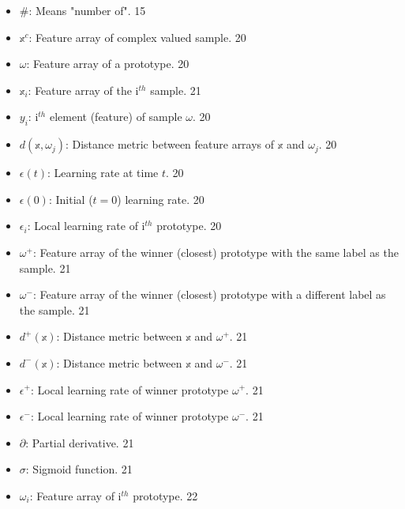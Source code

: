 \documentclass[12pt,twoside]{report}
\begin{document}
\begin{spacing}{1.5}
\begin{itemize}
  \item \#: Means "number of". 15

  \item $\mathbb{x}^{c}$: Feature array of complex valued sample. 20

  \item $\omega$: Feature array of a prototype. 20

  \item $\mathbb{x}_i$: Feature array of the i$^{th}$ sample. 21

\item $y_{i}$: i$^{th}$ element (feature) of sample $\omega$. 20

\item $d(\mathbb{x},\omega_{j})$: Distance metric between feature arrays of $\mathbb{x}$ and $\omega_{j}$. 20

\item $\epsilon(t)$: Learning rate at time $t$. 20

\item $\epsilon(0)$: Initial ($t=0$) learning rate. 20

\item $\epsilon_{i}$: Local learning rate of i$^{th}$ prototype. 20

\item $\omega^{+}$: Feature array of the winner (closest) prototype with the same label as the sample. 21

\item $\omega^{-}$: Feature array of the winner (closest) prototype with a different label as the sample. 21

\item $d^{+}(\mathbb{x})$: Distance metric between $\mathbb{x}$ and $\omega^{+}$. 21

\item $d^{-}(\mathbb{x})$: Distance metric between $\mathbb{x}$ and $\omega^{-}$. 21

\item $\epsilon^{+}$: Local learning rate of winner prototype $\omega^{+}$. 21

\item $\epsilon^{-}$: Local learning rate of winner prototype $\omega^{-}$. 21

\item $\partial$: Partial derivative. 21

\item $\sigma$: Sigmoid function. 21

\item $\omega_{i}$: Feature array of i$^{th}$ prototype. 22


\end{itemize}
\end{spacing}
\end{document}
